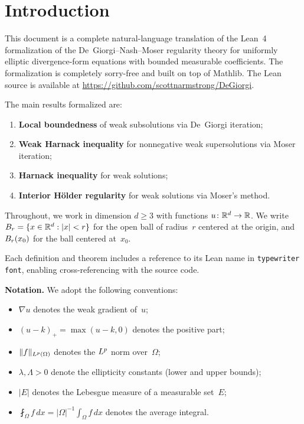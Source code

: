 \chapter{Introduction}\label{sec:intro}

This document is a complete natural-language translation of the Lean~4 formalization of the De~Giorgi--Nash--Moser regularity theory for uniformly elliptic divergence-form equations with bounded measurable coefficients. The formalization is completely sorry-free and built on top of Mathlib. The Lean source is available at \url{https://github.com/scottnarmstrong/DeGiorgi}.

The main results formalized are:
\begin{enumerate}[label=(\roman*)]
  \item \textbf{Local boundedness} of weak subsolutions via De~Giorgi iteration;
  \item \textbf{Weak Harnack inequality} for nonnegative weak supersolutions via Moser iteration;
  \item \textbf{Harnack inequality} for weak solutions;
  \item \textbf{Interior H\"older regularity} for weak solutions via Moser's method.
\end{enumerate}

Throughout, we work in dimension $d \ge 3$ with functions $u \colon \mathbb{R}^d \to \mathbb{R}$. We write $B_{r} = \{x \in \mathbb{R}^d : |x| < r\}$ for the open ball of radius~$r$ centered at the origin, and $B_{r}(x_0)$ for the ball centered at~$x_0$.

Each definition and theorem includes a reference to its Lean name in \texttt{typewriter font}, enabling cross-referencing with the source code.

\bigskip
\noindent\textbf{Notation.} We adopt the following conventions:
\begin{itemize}
  \item $\nabla u$ denotes the weak gradient of~$u$;
  \item $(u - k)_+ = \max(u - k, 0)$ denotes the positive part;
  \item $\|f\|_{L^{p}(\Omega)}$ denotes the $L^{p}$ norm over~$\Omega$;
  \item $\lambda, \Lambda > 0$ denote the ellipticity constants (lower and upper bounds);
  \item $|E|$ denotes the Lebesgue measure of a measurable set~$E$;
  \item $\fint_\Omega f\, dx = |\Omega|^{-1}\int_\Omega f\, dx$ denotes the average integral.
\end{itemize}



